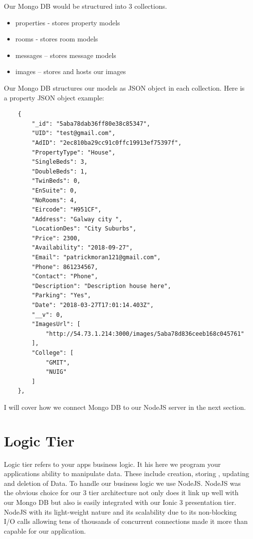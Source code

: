 Our Mongo DB would be structured into 3 collections.
\begin{itemize}
    \item properties - stores property models 
    \item rooms - stores room models
    \item messages – stores message models 
    \item images – stores and hosts our images
\end{itemize}


Our Mongo DB structures our models as JSON object in each collection. Here is a property JSON object example:

\begin{verbatim}
    {
        "_id": "5aba78dab36ff80e38c85347",
        "UID": "test@gmail.com",
        "AdID": "2ec810ba29cc91c0ffc19913ef75397f",
        "PropertyType": "House",
        "SingleBeds": 3,
        "DoubleBeds": 1,
        "TwinBeds": 0,
        "EnSuite": 0,
        "NoRooms": 4,
        "Eircode": "H951CF",
        "Address": "Galway city ",
        "LocationDes": "City Suburbs",
        "Price": 2300,
        "Availability": "2018-09-27",
        "Email": "patrickmoran121@gmail.com",
        "Phone": 861234567,
        "Contact": "Phone",
        "Description": "Description house here",
        "Parking": "Yes",
        "Date": "2018-03-27T17:01:14.403Z",
        "__v": 0,
        "ImagesUrl": [
            "http://54.73.1.214:3000/images/5aba78d836ceeb168c045761"
        ],
        "College": [
            "GMIT",
            "NUIG"
        ]
    },
\end{verbatim}

I will cover how we connect Mongo DB to our NodeJS server in the next section.

\section{Logic Tier}

Logic tier refers to your apps business logic. It his here we program your applications ability to manipulate data. These include creation, storing , updating and deletion of Data. To handle our business logic we use NodeJS. NodeJS was the obvious choice for our 3 tier architecture not only does it link up well with our Mongo DB  but also is easily integrated with our Ionic 3 presentation tier. NodeJS with its light-weight nature and its scalability due to its non-blocking I/O calls allowing tens of thousands of concurrent connections made it more than capable for our application.

